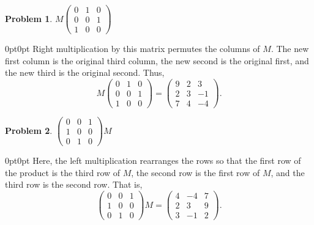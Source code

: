 \documentclass[12pt]{article}
\newenvironment{answer}
    {\begin{adjustwidth}{0pt}{0pt}}
    {\end{adjustwidth}}
\newtheorem{problem}{Problem}
\theoremstyle{remark}  %
\begin{document}
\begin{problem}
$
M
\begin{pmatrix}
0 & 1 & 0 \\
0 & 0 & 1 \\
1 & 0 & 0
\end{pmatrix}
$
\end{problem}
\begin{answer}
Right multiplication by this matrix permutes the columns of \(M\). The new first column is the original third column, the new second is the original first, and the new third is the original second. Thus,
\[
M \begin{pmatrix}
0 & 1 & 0 \\
0 & 0 & 1 \\
1 & 0 & 0
\end{pmatrix}
=
\begin{pmatrix}
9 & 2 & 3 \\
2 & 3 & -1 \\
7 & 4 & -4
\end{pmatrix}.
\]
\end{answer}

\begin{problem}
$
\begin{pmatrix}
0 & 0 & 1 \\
1 & 0 & 0 \\
0 & 1 & 0
\end{pmatrix} M
$
\end{problem}
\begin{answer}
Here, the left multiplication rearranges the rows so that the first row of the product is the third row of \(M\), the second row is the first row of \(M\), and the third row is the second row. That is,
\[
\begin{pmatrix}
0 & 0 & 1 \\
1 & 0 & 0 \\
0 & 1 & 0
\end{pmatrix} M
=
\begin{pmatrix}
4 & -4 & 7 \\
2 & 3 & 9 \\
3 & -1 & 2
\end{pmatrix}.
\]
\end{answer}
\end{document}
